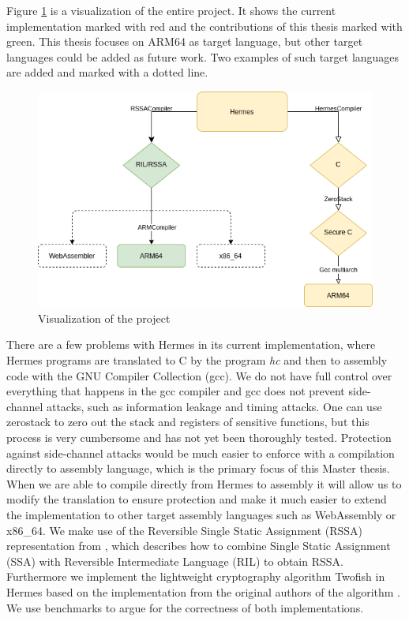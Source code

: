 Figure \ref{fig:compilationProcess} is a visualization of the entire project. It shows the current implementation marked with red and the contributions of this thesis marked with green. This thesis focuses on ARM64 as target language, but other target languages could be added as future work. Two examples of such target languages are added and marked with a dotted line.
\begin{figure}[ht]
  \centering
  \includegraphics[scale=0.57]{Graphics/compilationProcess.png}
  \caption{Visualization of the project}
  \label{fig:compilationProcess}
\end{figure}

There are a few problems with Hermes in its current implementation, where Hermes programs are translated to C by the program \emph{hc} and then to assembly code with the GNU Compiler Collection (gcc).
We do not have full control over everything that happens in the gcc compiler and gcc does not prevent side-channel attacks, such as information leakage and timing attacks\cite{Simon2018}.
One can use zerostack\cite{Github.zerostack} to zero out the stack and registers of sensitive functions, but this process is very cumbersome and has not yet been thoroughly tested. 
Protection against side-channel attacks would be much easier to enforce with a compilation directly to assembly language, which is the primary focus of this Master thesis.
When we are able to compile directly from Hermes to assembly it will allow us to modify the translation to ensure protection and make it much easier to extend the implementation to other target assembly languages such as WebAssembly or x86\_64.
We make use of the Reversible Single Static Assignment (RSSA) representation from \cite{10.1007/978-3-319-41579-6_16}, which describes how to combine Single Static Assignment (SSA) with Reversible Intermediate Language (RIL) to obtain RSSA.
Furthermore we implement the lightweight cryptography algorithm Twofish in Hermes based on the implementation from the original authors of the algorithm \cite{GIT2F}. We use benchmarks to argue for the correctness of both implementations.



